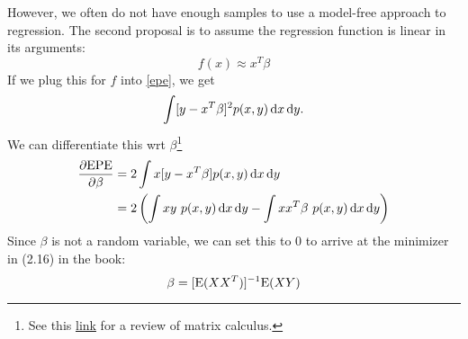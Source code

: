 However, we often do not have enough samples to use a model-free approach to regression. The second proposal is to assume the regression function is linear in its arguments:
$$
f(x) \approx x^T \beta
$$
If we plug this for $f$ into \eqref{epe}, we get
$$
\int [y - x^T \beta]^2 p(x, y) \operatorname{d}\!{x} \operatorname{d}\!{y}.
$$
We can differentiate this wrt $\beta$\footnote{See this \href{https://www.matrixcalculus.org/}{link} for a review of matrix calculus.}
\begin{align*}
  \frac{\partial \mathrm{EPE}}{\partial \beta} &= 2 \int x [y - x^T \beta] p(x, y) \d x \d y\\
                                               &= 2\left(\int x y\ p(x, y)\d x \d y - \int xx^T\beta\ p(x, y) \d x \d y\right)
\end{align*}
Since $\beta$ is not a random variable, we can set this to $0$ to arrive at the minimizer in (2.16) in the book:
$$
\beta = [\mathrm{E} (XX^T)]^{-1} \mathrm{E} (XY)
$$
